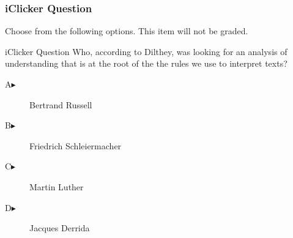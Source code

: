 \begin{frame}
  \frametitle{iClicker Question}
Choose from the following options. This item will not be graded.
\begin{block}{iClicker Question}
Who, according to Dilthey, was looking for an analysis of
understanding that is at the root of the the rules we use to interpret texts?
\end{block}
\begin{description}
\item[A\hspace{.2in}$\blacktriangleright$] Bertrand Russell
\item[B\hspace{.2in}$\blacktriangleright$] Friedrich Schleiermacher
\item[C\hspace{.2in}$\blacktriangleright$] Martin Luther
\item[D\hspace{.2in}$\blacktriangleright$] Jacques Derrida
\end{description}
\end{frame}
